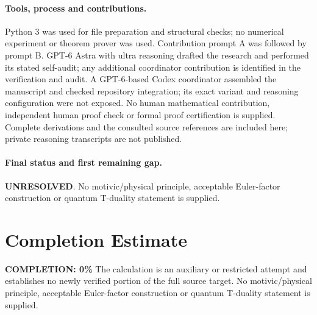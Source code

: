 \documentclass[11pt]{article}
\begin{document}
\paragraph{Tools, process and contributions.}
Python 3 was used for file preparation and structural checks; no numerical experiment or theorem prover was used. Contribution prompt A was followed by prompt B. GPT-6 Astra with ultra reasoning drafted the research and performed its stated self-audit; any additional coordinator contribution is identified in the verification and audit. A GPT-6-based Codex coordinator assembled the manuscript and checked repository integration; its exact variant and reasoning configuration were not exposed. No human mathematical contribution, independent human proof check or formal proof certification is supplied. Complete derivations and the consulted source references are included here; private reasoning transcripts are not published.

\paragraph{Final status and first remaining gap.}
\textbf{UNRESOLVED}. No motivic/physical principle, acceptable Euler-factor construction or quantum T-duality statement is supplied.

\section{Completion Estimate}
\noindent\textbf{COMPLETION: 0\%}
The calculation is an auxiliary or restricted attempt and establishes no newly verified portion of the full source target. No motivic/physical principle, acceptable Euler-factor construction or quantum T-duality statement is supplied.
\end{document}
